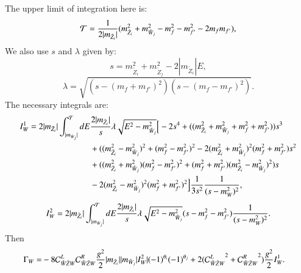 \documentclass[final,3p,times]{elsarticle}
\begin{document}
The upper limit of integration here is:
\begin{equation}
\mathcal{T} = {1 \over 2|m_{\tilde{Z}_{i}}|} (m_{\tilde{Z}_i}^2 + m_{\tilde{W}_j}^2 - m_{f}^2 - m_{f'}^2 - 2m_{f}m_{f'}),
\end{equation}
We also use $s$ and $\lambda$ given by:
\begin{equation}
s = m_{\tilde{Z}_{i}}^2 + m_{\tilde{Z}_j}^2 - 2|m_{\tilde{Z}_i}|E,
\end{equation}
\begin{equation}
\lambda = \sqrt{(s - (m_{f} + m_{f'})^2)(s - (m_{f} - m_{f'})^2)}.
\end{equation}
The necessary integrals are:	
\begin{equation}
\begin{aligned}
I_{W}^{1} = 2|m_{\tilde{Z}_i}| \int_{|m_{\tilde{W}_{j}}|}^{\mathcal{T}} dE & {2|m_{\tilde{Z}_i}| \over s} \lambda \sqrt{E^2 - m_{\tilde{W}_j}^2} \Big[-2s^4 + ((m_{\tilde{Z}_i}^2 + m_{\tilde{W}_j}^2 + m_{f}^2 + m_{f'}^2))s^3 \\ & + ((m_{\tilde{Z}_i}^2 - m_{\tilde{W}_j}^2)^2 + (m_{f}^2 - m_{f'}^2)^2 - 2(m_{\tilde{Z}_i}^2 + m_{\tilde{W}_j}^2)^2 (m_{f}^2 + m_{f'}^2)s^2 \\ & + ((m_{\tilde{Z}_i}^2 + m_{\tilde{W}_j}^2)(m_{f}^2 - m_{f'}^2)^2 + (m_{f}^2 + m_{f'}^2)(m_{\tilde{Z}_i}^2 - m_{\tilde{W}_j}^2)^2)s \\ & - 2(m_{\tilde{Z_{i}}}^2 - m_{\tilde{W}_j}^2)^2 (m_{f}^2 + m_{f'}^2)^2\Big]{1 \over 3s^2}{1 \over (s-m_{W}^2)^2},
\end{aligned}
\end{equation}
\begin{equation}
\begin{aligned}
I_{W}^{2} = 2|m_{\tilde{Z}_i}| \int_{|m_{\tilde{W}_{j}}|}^{\mathcal{T}} dE {2|m_{\tilde{Z}_i}| \over s} \lambda \sqrt{E^2 - m_{\tilde{W}_j}^2} (s - m_{f}^2 - m_{f'}^2){1 \over (s-m_{W}^2)^2}.
\end{aligned}
\end{equation}
Then
\begin{equation}
\begin{aligned}
\Gamma_W = & -8 \mathcal{C}_{\tilde{W} \tilde{Z} W}^L  \mathcal{C}_{\tilde{W} \tilde{Z} W}^R  {g^2 \over 2} |m_{\tilde{Z}_i}||m_{\tilde{W}_j}|I_{W}^2|(-1)^{\theta_i}(-1)^{\theta_j} + 2({\mathcal{C}_{\tilde{W} \tilde{Z} W}^L}^2 + {\mathcal{C}_{\tilde{W} \tilde{Z} W}^R}^2){g^2 \over 2} I_{W}^1.
\end{aligned}
\end{equation}
\end{document}
